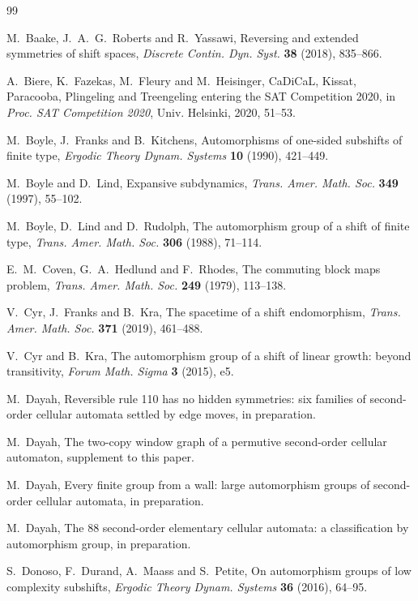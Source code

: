 \documentclass[11pt]{amsart}
\theoremstyle{definition}
\theoremstyle{remark}
\begin{document}
\begin{thebibliography}{99}

 M.~Baake, J.~A.~G.~Roberts and R.~Yassawi, Reversing and extended symmetries of shift spaces, \emph{Discrete Contin. Dyn. Syst.} \textbf{38} (2018), 835--866.

 A.~Biere, K.~Fazekas, M.~Fleury and M.~Heisinger, CaDiCaL, Kissat, Paracooba, Plingeling and Treengeling entering the SAT Competition 2020, in \emph{Proc. SAT Competition 2020}, Univ. Helsinki, 2020, 51--53.

 M.~Boyle, J.~Franks and B.~Kitchens, Automorphisms of one-sided subshifts of finite type, \emph{Ergodic Theory Dynam. Systems} \textbf{10} (1990), 421--449.

 M.~Boyle and D.~Lind, Expansive subdynamics, \emph{Trans. Amer. Math. Soc.} \textbf{349} (1997), 55--102.

 M.~Boyle, D.~Lind and D.~Rudolph, The automorphism group of a shift of finite type, \emph{Trans. Amer. Math. Soc.} \textbf{306} (1988), 71--114.

 E.~M.~Coven, G.~A.~Hedlund and F.~Rhodes, The commuting block maps problem, \emph{Trans. Amer. Math. Soc.} \textbf{249} (1979), 113--138.

 V.~Cyr, J.~Franks and B.~Kra, The spacetime of a shift endomorphism, \emph{Trans. Amer. Math. Soc.} \textbf{371} (2019), 461--488.

 V.~Cyr and B.~Kra, The automorphism group of a shift of linear growth: beyond transitivity, \emph{Forum Math. Sigma} \textbf{3} (2015), e5.

 M.~Dayah, Reversible rule 110 has no hidden symmetries: six families of second-order cellular automata settled by edge moves, in preparation.

 M.~Dayah, The two-copy window graph of a permutive second-order cellular automaton, supplement to this paper.

 M.~Dayah, Every finite group from a wall: large automorphism groups of second-order cellular automata, in preparation.

 M.~Dayah, The 88 second-order elementary cellular automata: a classification by automorphism group, in preparation.

 S.~Donoso, F.~Durand, A.~Maass and S.~Petite, On automorphism groups of low complexity subshifts, \emph{Ergodic Theory Dynam. Systems} \textbf{36} (2016), 64--95.


\end{thebibliography}
\end{document}
